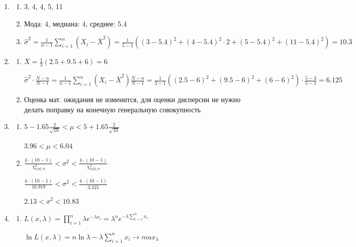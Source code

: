 \documentclass[12pt, a4paper]{article}\usepackage[]{graphicx}\usepackage[]{color}
\begin{document}
						\begin{enumerate}

							\item
							\begin{enumerate}
								\item 3, 4, 4, 5, 11
								\item Мода: 4, медиана: 4, среднее: 5.4
								\item $\hat{\sigma}^2 = \frac{1}{n-1} \sum_{i=1}^{n} \left(X_i - \overline{X}^2 \right) = \frac{1}{5-1} \left( (3-5.4)^2 + (4-5.4)^2 \cdot 2 + (5-5.4)^2 + (11-5.4)^2 \right) = 10.3 $
							\end{enumerate}

							\item
							\begin{enumerate}
								\item $\overline{X} = \frac{1}{3} (2.5 + 9.5 + 6) = 6$

								$\hat{\sigma}^2 \cdot \frac{N-n}{N-1} = \frac{1}{n-1} \sum_{i=1}^{n} \left(X_i - \overline{X}^2 \right) \frac{N-n}{N-1} = \frac{1}{3-1} ( (2.5-6)^2 + (9.5-6)^2 + (6-6)^2 ) \cdot \frac{5-3}{5-1} = 6.125$

								\item Оценка мат. ожидания не изменится, для оценки дисперсии не нужно делать поправку на конечную генеральную совокупность
							\end{enumerate}

							\item
							\begin{enumerate}
								\item $5 - 1.65 \frac{2}{\sqrt{10}} < \mu < 5 + 1.65 \frac{2}{\sqrt{10}}$

								$ 3.96 < \mu < 6.04$
								\item $\frac{4\cdot(10-1)}{\chi^2_{0.95; 9}} < \sigma^2 < \frac{4\cdot(10-1)}{\chi^2_{0.05; 9}}  $

								$\frac{4\cdot(10-1)}{16.919} < \sigma^2 < \frac{4\cdot(10-1)}{3.325}  $

								$2.13 < \sigma^2 < 10.83$
							\end{enumerate}

							\item
							\begin{enumerate}
								\item $L(x, \lambda) = \prod_{i=1}^n \lambda e^{-\lambda x_i} = \lambda^n e^{-\lambda \sum_{i=1}^n x_i} $

								$\ln L(x, \lambda) = n \ln \lambda - \lambda \sum_{i=1}^n x_i \to max_\lambda $


\end{enumerate}
\end{enumerate}
\end{document}
